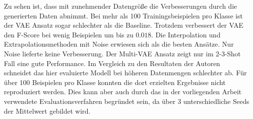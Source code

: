 Zu sehen ist, dass mit zunehmender Datengröße die Verbesserungen durch die generierten Daten abnimmt. Bei mehr als 100 Trainingsbeispielen pro Klasse ist der VAE Ansatz sogar schlechter als die Baseline. Trotzdem verbessert der VAE den F-Score bei wenig Beispielen um bis zu $0.018$. Die Interpolation und Extrapolationsmethoden mit Noise erwiesen sich als die besten Ansätze. Nur Noise lieferte keine Verbesserung. Der Multi-VAE Ansatz zeigt nur im 2-3-Shot Fall eine gute Performance. Im Vergleich zu den Resultaten der Autoren \cite{Garay-Maestre2019} schneidet das hier evaluierte Modell bei höheren Datenmengen schlechter ab. Für über 100 Beispielen pro Klasse konnten die dort erzielten Ergebnisse nicht reproduziert werden. Dies kann aber auch durch das in der vorliegenden Arbeit verwendete Evaluationsverfahren begründet sein, da über 3 unterschiedliche Seeds der Mittelwert gebildet wird.


